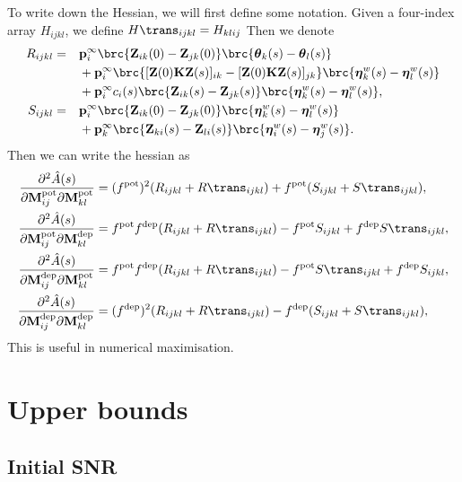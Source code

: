 \documentclass[12pt]{article}
\newcommand{\pr}{\mathbf{p}}
\newcommand{\eq}{\pr^\infty}
\newcommand{\fund}{\mathbf{Z}}
\newcommand{\etw}{\boldsymbol{\eta}^w}
\newcommand{\thb}{\boldsymbol{\theta}}
\newcommand{\M}{\mathbf{M}}
\newcommand{\enc}{\mathbf{K}}
\newcommand{\pot}{^{\text{pot}}}
\newcommand{\dep}{^{\text{dep}}}
\renewcommand{\pdiff}[2]{\frac{\partial #1}{\partial #2}}
\begin{document}
To write down the Hessian, we will first define some notation.
Given a four-index array $H_{ijkl}$, we define $H\trans_{ijkl} = H_{klij}$
Then we denote
%
\begin{equation}\label{eq:hessparts}
\begin{aligned}
  R_{ijkl} &=
    &&\eq_i \brc{\fund_{ik}(0) - \fund_{jk}(0)} \brc{\thb_k(s) - \thb_l(s)} \\
    &&&+ \eq_i \brc{[\fund(0)\enc\fund(s)]_{ik} - [\fund(0)\enc\fund(s)]_{jk}} \brc{\etw_k(s) - \etw_l(s)} \\
    &&&+ \eq_i c_i(s) \brc{\fund_{ik}(s) - \fund_{jk}(s)} \brc{\etw_k(s) - \etw_l(s)},  \\
  S_{ijkl} &=
    &&\eq_i \brc{\fund_{ik}(0) - \fund_{jk}(0)} \brc{\etw_k(s) - \etw_l(s)} \\
    &&&+ \eq_k \brc{\fund_{ki}(s) - \fund_{li}(s)} \brc{\etw_i(s) - \etw_j(s)}.
\end{aligned}
\end{equation}
%
Then we can write the hessian as
%
\begin{equation}\label{eq:hessian}
\begin{aligned}
  \pdiff{^2\hat{A}(s)}{\M\pot_{ij} \partial\M\pot_{kl}} &=
     (f\pot)^2 (R_{ijkl} + R\trans_{ijkl})
     + f\pot(S_{ijkl} + S\trans_{ijkl}), \\
  \pdiff{^2\hat{A}(s)}{\M\pot_{ij} \partial\M\dep_{kl}} &=
     f\pot f\dep (R_{ijkl} + R\trans_{ijkl})
     - f\pot S_{ijkl} + f\dep S\trans_{ijkl}, \\
  \pdiff{^2\hat{A}(s)}{\M\dep_{ij} \partial\M\pot_{kl}} &=
     f\pot f\dep (R_{ijkl} + R\trans_{ijkl})
     - f\pot S\trans_{ijkl} + f\dep S_{ijkl}, \\
  \pdiff{^2\hat{A}(s)}{\M\dep_{ij} \partial\M\dep_{kl}} &=
     (f\dep)^2 (R_{ijkl} + R\trans_{ijkl})
     - f\dep(S_{ijkl} + S\trans_{ijkl}), \\
\end{aligned}
\end{equation}
%
This is useful in numerical maximisation.

\section{Upper bounds}\label{sec:upperbnds}



\subsection{Initial SNR}\label{sec:initial}
\end{document}
